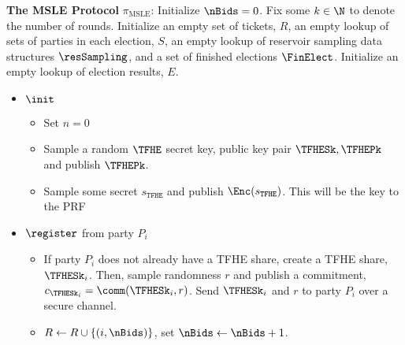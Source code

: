 \begin{mdframed}
	\textbf{The MSLE Protocol} $\pi_{\text{MSLE}}$:
	Initialize $\nBids = 0$. Fix some $k \in \N$ to denote the number of rounds.
	Initialize an empty set of tickets, $R$, an empty lookup of sets of parties in each election, $S$,
	an empty lookup of reservoir sampling data structures $\resSampling$,
	and a set of finished elections $\FinElect$. Initialize an empty lookup of election results, $E$.

	\begin{itemize}
		\item $\init$
		      \begin{itemize}
			      \item Set $n = 0$
			      \item Sample a random $\TFHE$ secret key, public key pair $\TFHESk, \TFHEPk$ and publish $\TFHEPk$.
			      \item Sample some secret $s_{\texttt{TFHE}}$ and publish $\Enc(s_{\texttt{TFHE}})$.
			            This will be the key to the PRF
		      \end{itemize}

		\item $\register$ from party $P_i$
		      \begin{itemize}
			      \item If party $P_i$ does not already have a TFHE share, create a TFHE share, $\TFHESk_i$.
			            Then, sample randomness $r$ and publish a commitment, $c_{\TFHESk_i} = \comm(\TFHESk_i, r)$. Send $\TFHESk_i$ and $r$
			            to party $P_i$ over a secure channel.

			      \item $R \gets R \cup \{(i, \nBids)\}$, set $\nBids \gets \nBids + 1$.
		      \end{itemize}


\end{itemize}
\end{mdframed}
